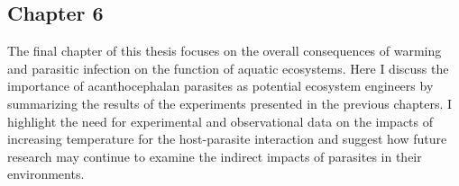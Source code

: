 \subsection{Chapter 6}
The final chapter of this thesis focuses on the overall consequences of warming and parasitic infection on the function of aquatic ecosystems. Here I discuss the importance of acanthocephalan parasites as potential ecosystem engineers by summarizing the results of the experiments presented in the previous chapters. I highlight the need for experimental and observational data on the impacts of increasing temperature for the host-parasite interaction and suggest how future research may continue to examine the indirect impacts of parasites in their environments. 

%